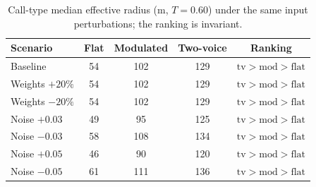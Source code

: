 \begin{table}[!ht]
\centering
\caption{Call-type median effective radius (m, $T=0.60$) under the same input perturbations; the ranking is invariant.}
\label{tab:p7rank}
\small
\begin{tabular}{lcccc}
\toprule
Scenario & Flat & Modulated & Two-voice & Ranking \\
\midrule
Baseline & 54 & 102 & 129 & $\mathrm{tv}>\mathrm{mod}>\mathrm{flat}$ \\
Weights $+20\%$ & 54 & 102 & 129 & $\mathrm{tv}>\mathrm{mod}>\mathrm{flat}$ \\
Weights $-20\%$ & 54 & 102 & 129 & $\mathrm{tv}>\mathrm{mod}>\mathrm{flat}$ \\
Noise $+0.03$ & 49 & 95 & 125 & $\mathrm{tv}>\mathrm{mod}>\mathrm{flat}$ \\
Noise $-0.03$ & 58 & 108 & 134 & $\mathrm{tv}>\mathrm{mod}>\mathrm{flat}$ \\
Noise $+0.05$ & 46 & 90 & 120 & $\mathrm{tv}>\mathrm{mod}>\mathrm{flat}$ \\
Noise $-0.05$ & 61 & 111 & 136 & $\mathrm{tv}>\mathrm{mod}>\mathrm{flat}$ \\
\bottomrule
\end{tabular}
\end{table}